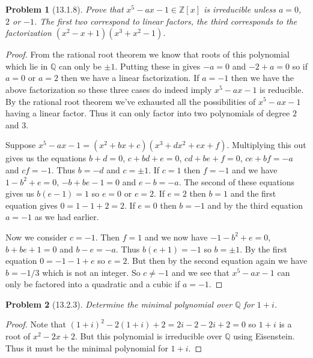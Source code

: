 \documentclass{article}
\newtheorem{problem}{Problem}
\begin{document}
\begin{problem}[13.1.8]
Prove that $x^5 - ax - 1 \in \mathbb{Z}[x]$ is irreducible unless $a = 0$, $2$ or $-1$. The first two correspond to linear factors, the third corresponds to the factorization $(x^2 - x + 1)(x^3 + x^2 - 1)$.
\end{problem}
\begin{proof}
From the rational root theorem we know that roots of this polynomial which lie in $\mathbb{Q}$ can only be $\pm 1$. Putting these in gives $-a = 0$ and $-2 + a = 0$ so if $a = 0$ or $a = 2$ then we have a linear factorization. If $a = -1$ then we have the above factorization so these three cases do indeed imply $x^5 - ax - 1$ is reducible. By the rational root theorem we've exhausted all the possibilities of $x^5 - ax - 1$ having a linear factor. Thus it can only factor into two polynomials of degree $2$ and $3$.

Suppose $x^5 - ax - 1 = (x^2 + bx + c)(x^3 + dx^2 + ex + f)$. Multiplying this out gives us the equations $b + d = 0$, $c + bd + e = 0$, $cd + be + f = 0$, $ce + bf = -a$ and $cf = -1$. Thus $b = -d$ and $c = \pm 1$. If $c = 1$ then $f = -1$ and we have $1 - b^2 + e = 0$, $-b + be - 1 = 0$ and $e-b = -a$. The second of these equations gives us $b(e-1) = 1$ so $e = 0$ or $e = 2$. If $e = 2$ then $b = 1$ and the first equation gives $0 = 1 - 1 + 2 = 2$. If $e = 0$ then $b = -1$ and by the third equation $a = -1$ as we had earlier.

Now we consider $c = -1$. Then $f = 1$ and we now have $-1 - b^2 + e = 0$, $b + be + 1 = 0$ and $b-e = -a$. Thus $b(e+1) = -1$ so $b = \pm 1$. By the first equation $0 = -1 - 1 + e$ so $e = 2$. But then by the second equation again we have $b = -1/3$ which is not an integer. So $c \neq -1$ and we see that $x^5 - ax - 1$ can only be factored into a quadratic and a cubic if $a = -1$.
\end{proof}

\begin{problem}[13.2.3]
Determine the minimal polynomial over $\mathbb{Q}$ for $1 + i$.
\end{problem}
\begin{proof}
Note that $(1+i)^2 - 2(1 + i) + 2 = 2i - 2 - 2i + 2 = 0$ so $1 + i$ is a root of $x^2 - 2x + 2$. But this polynomial is irreducible over $\mathbb{Q}$ using Eisenstein. Thus it must be the minimal polynomial for $1 + i$.
\end{proof}
\end{document}
